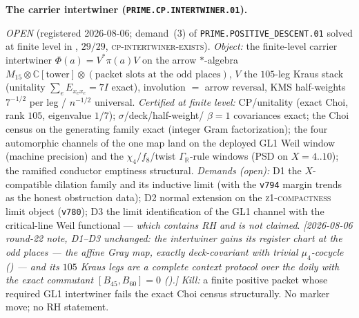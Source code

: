 \par\smallskip\noindent\textbf{The carrier intertwiner
(\texttt{PRIME.CP.INTERTWINER.01}).}
{\sloppy
\emph{OPEN} (registered 2026-08-06; demand~(3) of
\texttt{PRIME.POSITIVE\_DESCENT.01} solved at finite level in
, $29/29$,
\textsc{cp-intertwiner-exists}).  \emph{Object:} the finite-level
carrier intertwiner $\Phi(a)=V^{*}\pi(a)V$ on the arrow
$*$-algebra $M_{15}\otimes\mathbb C[\text{tower}]\otimes
(\text{packet slots at the odd places})$, $V$ the $105$-leg Kraus
stack (unitality $\sum_eE_{x_ex_e}=7I$ exact), involution $=$
arrow reversal, KMS half-weights $7^{-1/2}$ per leg / $n^{-1/2}$
universal.  \emph{Certified at finite level:} CP/unitality (exact
Choi, rank $105$, eigenvalue $1/7$); $\sigma$/deck/half-weight/
$\beta=1$ covariances exact; the Choi census on the generating
family exact (integer Gram factorization); the four automorphic
channels of the one map land on the deployed GL1 Weil window
(machine precision) and the $\chi_4/f_8$/twist
$\Gamma_{\mathbb R}$-rule windows (PSD on $X=4..10$); the ramified
conductor emptiness structural.  \emph{Demands (open):} D1 the
$X$-compatible dilation family and its inductive limit (with the
\texttt{v794} margin trends as the honest obstruction data); D2
normal extension on the \textsc{z1-compactness} limit object
(\texttt{v780}); D3 the limit identification of the GL1 channel
with the critical-line Weil functional --- \emph{which contains RH
and is not claimed}.  \emph{[2026-08-06 round-22 note, D1--D3
unchanged: the intertwiner gains its register chart at the odd
places --- the affine Gray map, exactly deck-covariant with
trivial $\mu_4$-cocycle
() --- and its $105$ Kraus
legs are a complete context protocol over the doily with the
exact commutant $[B_{45},B_{60}]=0$
().]}  \emph{Kill:} a finite
positive packet whose required GL1 intertwiner fails the exact
Choi census structurally.
No marker move; no RH statement.\par}


